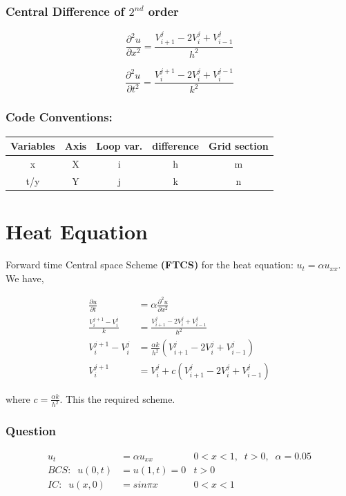 \documentclass[a4paper,14pt,twoside,onecolumn,openany,final]{memoir}
\begin{document}
 \subsection{Central Difference of \(2^{nd}\) order}
 \[\frac{\partial^2 u}{\partial x^2} = \frac{V_{i+1}^j-2V_i^j+V_{i-1}^j}{h^2}\]

 \[\frac{\partial^2 u}{\partial t^2} = \frac{V_i^{j+1}-2V_i^j+V_i^{j-1}}{k^2}\]

 \vspace{2cm}
 \subsection{Code Conventions:}
 \begin{table}[h!]

     \begin{tabular}{||c c c c c||}
     \hline
     Variables & Axis & Loop var. & difference & Grid section \\ [0.5ex]
     \hline\hline
     x & X & i & h & m \\
     t/y & Y & j & k & n \\[1ex]
     \hline
     \end{tabular}
    \end{table}


 \chapter{Heat Equation}
 Forward time Central space Scheme \textbf{(FTCS)} for the heat equation: \(u_t= \alpha u_{xx}\).\\
 We have,

\begin{align*}
 \frac{\partial u}{\partial t} &= \alpha \frac{\partial^2 u}{\partial x^2} \\
 \frac{V_i^{j+1}-V_i^j}{k} &= \frac{V_{i+1}^j-2V_i^j+V_{i-1}^j}{h^2} \\
 V_i^{j+1}-V_i^j &= \frac{\alpha k}{h^2} (V_{i+1}^j-2V_i^j+V_{i-1}^j) \\
 V_i^{j+1} &= V_i^j+c (V_{i+1}^j-2V_i^j+V_{i-1}^j)
 \end{align*}

 where \( c=\frac{\alpha k}{h^2} \). This the required scheme.
 \vspace{1cm}

\subsection{Question}
\begin{align*}
    u_t&= \alpha u_{xx}           &   0<x<1, \;\; t>0, \;\; \alpha=0.05\\
    BCS:\;\; u(0,t) &= u(1,t)=0   &   t>0\\
    IC:\;\; u(x,0)  &= sin{\pi}x  &   0<x<1
\end{align*}
\clearpage
\end{document}
